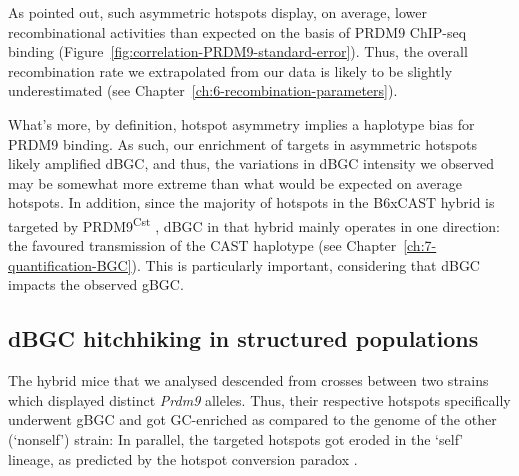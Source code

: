 As \citet{li2018highresolution} pointed out, such asymmetric hotspots display, on average, lower recombinational activities than expected on the basis of PRDM9 ChIP-seq binding (Figure~\ref{fig:correlation-PRDM9-standard-error}).
Thus, the overall recombination rate we extrapolated from our data is likely to be slightly underestimated (see Chapter~\ref{ch:6-recombination-parameters}).

What's more, by definition, hotspot asymmetry implies a haplotype bias for PRDM9 binding.
As such, our enrichment of targets in asymmetric hotspots likely amplified dBGC, and thus, the variations in dBGC intensity we observed may be somewhat more extreme than what would be expected on average hotspots.
In addition, since the majority of hotspots in the B6xCAST hybrid is targeted by PRDM9\textsuperscript{Cst} \citep{smagulova2016evolutionary}, dBGC in that hybrid mainly operates in one direction: the favoured transmission of the CAST haplotype (see Chapter~\ref{ch:7-quantification-BGC}).
This is particularly important, considering that dBGC impacts the observed gBGC\@.




\subsection{dBGC hitchhiking in structured populations} 

The hybrid mice that we analysed descended from crosses between two strains which displayed distinct \textit{Prdm9} alleles.
Thus, their respective hotspots specifically underwent gBGC and got GC-enriched as compared to the genome of the other (‘nonself’) strain:
In parallel, the targeted hotspots got eroded in the ‘self’ lineage, as predicted by the hotspot conversion paradox \citep{boulton1997hotspot}.

